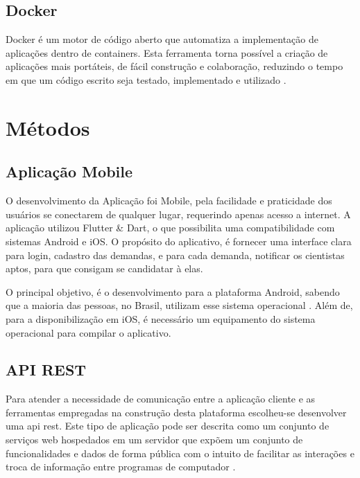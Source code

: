 \subsection{Docker}\label{subsec:docker}

Docker é um motor de código aberto que automatiza a implementação de aplicações dentro de containers. Esta ferramenta torna possível a criação de aplicações mais portáteis, de fácil construção e colaboração, reduzindo o tempo em que um código escrito seja testado, implementado e utilizado \cite{TheDockerBook}.

\section{Métodos}\label{sec:metodo}

\subsection{Aplicação Mobile}\label{subsec:app}

O desenvolvimento da Aplicação foi Mobile, pela facilidade e praticidade dos usuários se conectarem de qualquer lugar, requerindo apenas acesso a internet. A aplicação utilizou Flutter {\&} Dart, o que possibilita uma compatibilidade com sistemas Android e iOS. O propósito do aplicativo, é fornecer uma interface clara para login, cadastro das demandas, e para cada demanda, notificar os cientistas aptos, para que consigam se candidatar à elas.

O principal objetivo, é o desenvolvimento para a plataforma Android, sabendo que a maioria das pessoas, no Brasil, utilizam esse sistema operacional \cite{StatCounter}. Além de, para a disponibilização em iOS, é necessário um equipamento do sistema operacional para compilar o aplicativo.

\subsection{API REST}\label{subsec:apirest}

Para atender a necessidade de comunicação entre a aplicação cliente e as ferramentas empregadas na construção desta plataforma escolheu-se desenvolver uma \gls{api} \gls{rest}. Este tipo de aplicação pode ser descrita como um conjunto de serviços web hospedados em um servidor que expõem um conjunto de funcionalidades e dados de forma pública com o intuito de facilitar as interações e troca de informação entre programas de computador \cite{RestApiBook}.

